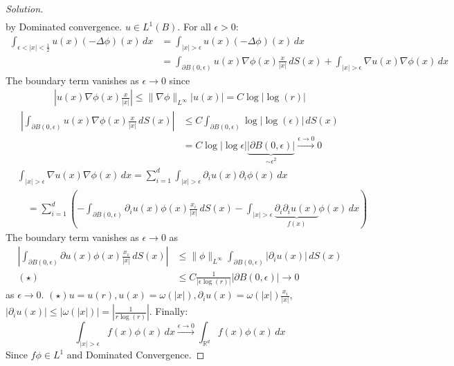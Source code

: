\documentclass{report}
\theoremstyle{tommy}
\begin{document}
\begin{proof}[Solution]
\begin{align*}
    \end{align*}
    by Dominated convergence. \(u \in L^1(B)\). For all \(\epsilon > 0\):
    \begin{align*}
      \int_{\epsilon < |x| < \frac{1}{2}} u(x) (-\Delta \phi)(x) \, dx 
      &= \int_{|x|>\epsilon} u(x) (-\Delta \phi)(x) \, dx \\
      &= \int_{\partial B(0, \epsilon)}u(x) \nabla \phi(x) \frac{x}{|x|} \, dS(x) + \int_{|x| > \epsilon} \nabla u(x) \nabla \phi(x) \, dx
    \end{align*}
    The boundary term vanishes as \(\epsilon \to 0\) since 
    \begin{align*}
      \left|u(x) \nabla \phi(x) \frac{x}{|x|}\right| \le \|\nabla \phi \|_{L^\infty} |u(x)| = C \log|\log(r)|
    \end{align*}
    \begin{align*}
      \left| \int_{\partial B(0, \epsilon)} u(x) \nabla \phi(x) \frac{x}{|x|} \, dS(x) \right| 
      &\le C \int_{\partial B(0, \epsilon)} \log |\log(\epsilon)| \, dS(x) \\
      &= C \log |\log \epsilon| \underbrace{|\partial B(0, \epsilon)|}_{\sim \epsilon^2} \xrightarrow{\epsilon \to 0} 0
    \end{align*}
    \begin{align*}
      &\int_{|x|> \epsilon} \nabla u(x) \nabla \phi(x) \, dx 
      = \sum_{i=1}^d \int_{|x|> \epsilon} \partial_i u(x) \partial_i \phi(x) \, dx \\
      &\quad= \sum_{i=1}^d \left(- \int_{\partial B(0, \epsilon)} \partial_i u(x) \phi(x) \frac{x_i}{|x|} \, dS(x) - \int_{|x|> \epsilon} \underbrace{\partial_i \partial_i u(x)}_{f(x)} \phi(x) \, dx\right)
    \end{align*}
    The boundary term vanishes as \(\epsilon \to 0\) as 
    \begin{align*}
      \left| \int_{\partial B(0, \epsilon)} \partial u(x) \phi(x) \frac{x_i}{|x|}\, dS(x) \right|
      &\le \|\phi\|_{L^\infty} \int_{\partial B(0, \epsilon)} |\partial_i u(x)| \, dS(x) \\
      (\star) \quad &\le C \frac{1}{|\epsilon \log(r)|} |\partial B(0, \epsilon)| \to 0
    \end{align*} as \(\epsilon \to 0\). 
    \((\star) u = u(r), u(x) = \omega(|x|), \partial_i u(x) = \omega(|x|)\frac{x_i}{|x|}\), \(|\partial_i u(x)| \le |\omega(|x|)| = \left|\frac{1}{r\log(r)}\right|\). Finally:
    \begin{equation*}
      \int_{|x|> \epsilon} f(x) \phi(x) \, dx \xrightarrow{\epsilon \to 0} \int_{\mathbb{R}^d} f(x) \phi(x) \, dx
    \end{equation*}
    Since \(f \phi \in L^1\) and Dominated Convergence.
  \end{proof}
\end{document}
